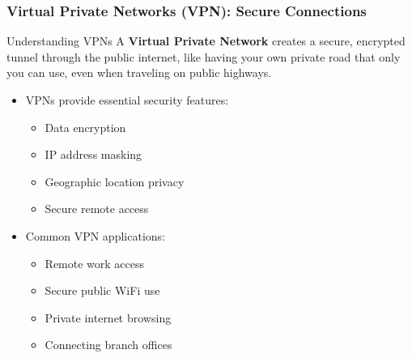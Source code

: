 \documentclass{beamer}
\begin{document}
\begin{frame}
    \frametitle{Virtual Private Networks (VPN): Secure Connections}
    
    \begin{block}{Understanding VPNs}
        A \textbf{Virtual Private Network} creates a secure, encrypted tunnel through the public internet, like having your own private road that only you can use, even when traveling on public highways.
    \end{block}
    
    \begin{itemize}
        \item VPNs provide essential security features:
        \begin{itemize}
            \item Data encryption
            \item IP address masking
            \item Geographic location privacy
            \item Secure remote access
        \end{itemize}
        
        \item Common VPN applications:
        \begin{itemize}
            \item Remote work access
            \item Secure public WiFi use
            \item Private internet browsing
            \item Connecting branch offices
        \end{itemize}
    \end{itemize}
\end{frame}
\end{document}
